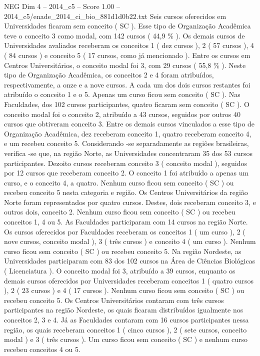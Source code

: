 \begin{textsample}{NEG Dim 4 – 2014\_c5 – Score 1.00 – 2014\_c5/enade\_2014\_ci\_bio\_881d1d0b22.txt}
Seis cursos oferecidos em Universidades ficaram sem conceito ( SC ).
Esse tipo de Organização Acadêmica teve o conceito 3 como modal, com 142 cursos ( 44,9 \% ).
Os demais cursos de Universidades avaliados receberam os conceitos 1 ( dez cursos ), 2 ( 57 cursos ), 4 ( 84 cursos ) e conceito 5 ( 17 cursos, como já mencionado ).
Entre os cursos em Centros Universitários, o conceito modal foi 3, com 29 cursos ( 55,8 \% ).
Neste tipo de Organização Acadêmica, os conceitos 2 e 4 foram atribuídos, respectivamente, a onze e a nove cursos.
A cada um dos dois cursos restantes foi atribuído o conceito 1 e o 5.
Apenas um curso ficou sem conceito ( SC ).
Nas Faculdades, dos 102 cursos participantes, quatro ficaram sem conceito ( SC ).
O conceito modal foi o conceito 2, atribuído a 43 cursos, seguidos por outros 40 cursos que obtiveram conceito 3.
Entre os demais cursos vinculados a esse tipo de Organização Acadêmica, dez receberam conceito 1, quatro receberam conceito 4, e um recebeu conceito 5.
Considerando -se separadamente as regiões brasileiras, verifica -se que, na região Norte, as Universidades concentraram 35 dos 53 cursos participantes.
Dezoito cursos receberam conceito 3 ( conceito modal ), seguidos por 12 cursos que receberam conceito 2.
O conceito 1 foi atribuído a apenas um curso, e o conceito 4, a quatro.
Nenhum curso ficou sem conceito ( SC ) ou recebeu conceito 5 nesta categoria e região.
Os Centros Universitários da região Norte foram representados por quatro cursos.
Destes, dois receberam conceito 3, e outros dois, conceito 2.
Nenhum curso ficou sem conceito ( SC ) ou recebeu conceitos 1, 4 ou 5.
As Faculdades participaram com 14 cursos na região Norte.
Os cursos oferecidos por Faculdades receberam os conceitos 1 ( um curso ), 2 ( nove cursos, conceito modal ), 3 ( três cursos ) e conceito 4 ( um curso ).
Nenhum curso ficou sem conceito ( SC ) ou recebeu conceito 5.
Na região Nordeste, as Universidades participaram com 83 dos 102 cursos na Área de Ciências Biológicas ( Licenciatura ).
O conceito modal foi 3, atribuído a 39 cursos, enquanto os demais cursos oferecidos por Universidades receberam conceitos 1 ( quatro cursos ), 2 ( 23 cursos ) e 4 ( 17 cursos ).
Nenhum curso ficou sem conceito ( SC ) ou recebeu conceito 5.
Os Centros Universitários contaram com três cursos participantes na região Nordeste, os quais ficaram distribuídos igualmente nos conceitos 2, 3 e 4.
Já as Faculdades contaram com 16 cursos participantes nessa região, os quais receberam conceitos 1 ( cinco cursos ), 2 ( sete cursos, conceito modal ) e 3 ( três cursos ).
Um curso ficou sem conceito ( SC ) e nenhum curso recebeu conceitos 4 ou 5.

\end{textsample}
